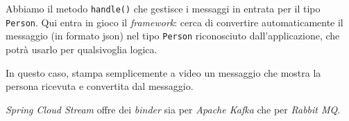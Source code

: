 Abbiamo il metodo \texttt{handle()} che gestisce i messaggi in entrata per il tipo \texttt{Person}.
Qui entra in gioco il \textit{framework}: cerca di convertire automaticamente il messaggio (in formato \acrshort{json}) nel tipo \texttt{Person} riconosciuto dall'applicazione, che potrà usarlo per qualsivoglia logica.

In questo caso, stampa semplicemente a video un messaggio che mostra la persona ricevuta e convertita dal messaggio.

\bigskip

\textit{Spring Cloud Stream} offre dei \textit{binder} sia per \textit{Apache Kafka} che per \textit{Rabbit MQ}.
